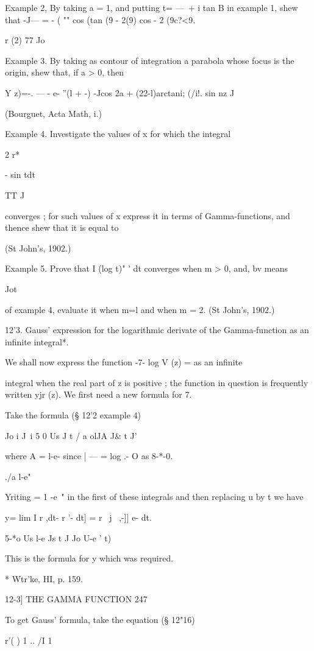 Example 2, By taking a = 1, and putting t= —\ + i tan B in example 1,
shew that -J— = - ( "" cos (tan (9 - 2(9) cos - 2 (9c?<9.

r (2) 77 Jo

Example 3. By taking as contour of integration a parabola whose focus
is the origin, shew that, if a > 0, then

Y z)=-. — - e- ''(l + -) -Jcos 2a + (22-l)arctani; (/i!. sin nz J

(Bourguet, Acta Math, i.)

Example 4. Investigate the values of x for which the integral

2 r*

 - sin tdt

TT J

converges ; for such values of x express it in terms of
Gamma-functions, and thence shew that it is equal to

(St John's, 1902.)

Example 5. Prove that I (log t)" ' dt converges when m > 0, and, bv
means

Jot

of example 4, evaluate it when m=l and when m = 2. (St John's, 1902.)

12'3. Gauss' expression for the logarithmic derivate of the
Gamma-function as an infinite integral*.

We shall now express the function -7- log V (z) = as an infinite

integral when the real part of z is positive ; the function in
question is frequently written yjr (z). We first need a new formula
for 7.

Take the formula (§ 12'2 example 4)

  Jo i J\ i 5 0 Us J t / a olJA J\& t J'

where A = l-e- since | — = log .- O as 8-*-0.

./a l-e"

 Yriting = 1 -e~" in the first of these integrals and then replacing u
by t we have

y= lim I r ,dt- r '- dt] = r \ j~ ,-]] e- dt.

5-*o Us l-e Js t J Jo U-e ' t)

This is the formula for y which was required.

* Wtr'ke, HI, p. 159.

12-3] THE GAMMA FUNCTION 247

To get Gauss' formula, take the equation (§ 12"16)

r'( ) 1 .. /I 1 \

